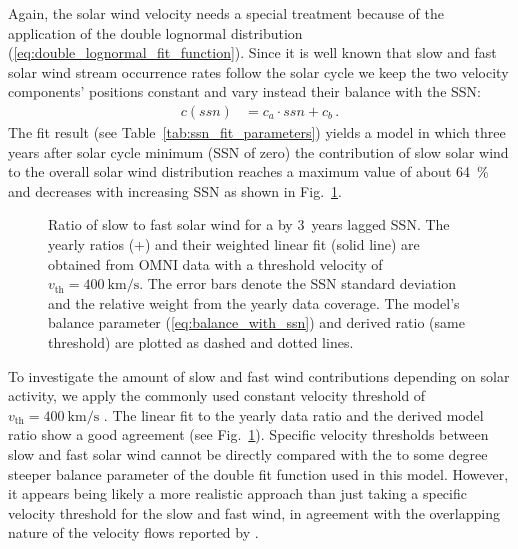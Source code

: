Again, the solar wind velocity needs a special treatment because of the application of the double lognormal distribution (\ref{eq:double_lognormal_fit_function}). Since it is well known that slow and fast solar wind stream occurrence rates follow the solar cycle we keep the two velocity components' positions constant and vary instead their balance with the SSN:
\begin{align}
	c(ssn) &= c_a \cdot ssn + c_b\,.	\label{eq:balance_with_ssn}
\end{align}
The fit result (see Table~\ref{tab:ssn_fit_parameters}) yields a model in which three years after solar cycle minimum (SSN of zero) the contribution of slow solar wind to the overall solar wind distribution reaches a maximum value of about \SI{64}{\percent} and decreases with increasing SSN as shown in Fig.~\ref{fig:Vdbl_SSN_ratio_f_plot}.
\begin{figure}
	\caption{Ratio of slow to fast solar wind for a by 3~years lagged SSN. The yearly ratios (+) and their weighted linear fit (solid line) are obtained from OMNI data with a threshold velocity of $v_\text{th} = \SI{400}{\km\per\s}$. The error bars denote the SSN standard deviation and the relative weight from the yearly data coverage. The model's balance parameter (\ref{eq:balance_with_ssn}) and derived ratio (same threshold) are plotted as dashed and dotted lines.}
	\label{fig:Vdbl_SSN_ratio_f_plot}
\end{figure}

To investigate the amount of slow and fast wind contributions depending on solar activity, we apply the commonly used constant velocity threshold of $v_\text{th} = \SI{400}{\km\per\s}$ \citep[p.~144]{Schwenn1990}. The linear fit to the yearly data ratio and the derived model ratio show a good agreement (see Fig.~\ref{fig:Vdbl_SSN_ratio_f_plot}). Specific velocity thresholds between slow and fast solar wind cannot be directly compared with the to some degree steeper balance parameter of the double fit function used in this model. However, it appears being likely a more realistic approach than just taking a specific velocity threshold for the slow and fast wind, in agreement with the overlapping nature of the velocity flows reported by \citet{McGregor2011b}.


